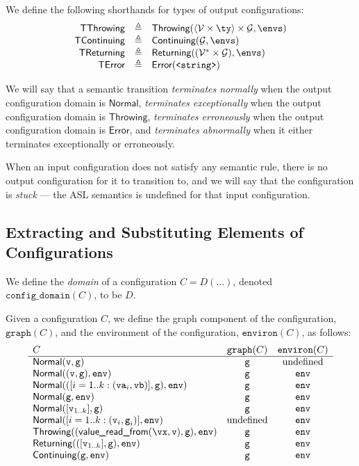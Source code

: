 \documentclass{book}
\newcommand\XGraphs[0]{\mathcal{G}}
\newcommand\vals[0]{\mathcal{V}}
\newcommand\configdomain[1]{\texttt{config\_domain}({#1})}
\newcommand\graphof[1]{\texttt{graph}({#1})}
\newcommand\environof[1]{\texttt{environ}({#1})}
\newcommand\TError[0]{\textsf{TError}}
\newcommand\TThrowing[0]{\textsf{TThrowing}}
\newcommand\TContinuing[0]{\textsf{TContinuing}}
\newcommand\TReturning[0]{\textsf{TReturning}}
\newcommand\valuereadfrom[0]{\textsf{value\_read\_from}}
\newcommand\Normal[0]{\textsf{Normal}}
\newcommand\Throwing[0]{\textsf{Throwing}}
\newcommand\Continuing[0]{\textsf{Continuing}}
\newcommand\Returning[0]{\textsf{Returning}}
\newcommand\Error[0]{\textsf{Error}}
\newcommand\env[0]{\texttt{env}}
\newcommand\vg[0]{\texttt{g}}
\newcommand\vv[0]{\texttt{v}}
\begin{document}
We define the following shorthands for types of output configurations:
\[
  \begin{array}{rcl}
    \TThrowing        &\triangleq& \Throwing(\langle\vals \times \ty\rangle \times \XGraphs, \envs)\\
    \TContinuing      &\triangleq& \Continuing(\XGraphs, \envs)\\
    \TReturning       &\triangleq& \Returning((\vals^* \times \XGraphs), \envs)\\
    \TError           &\triangleq& \Error(\texttt{<string>})\\
  \end{array}
\]

We will say that a semantic transition \emph{terminates normally} when the output configuration domain is $\Normal$,
\emph{terminates exceptionally} when the output configuration domain is $\Throwing$,
\emph{terminates erroneously} when the output configuration domain is $\Error$,
and \emph{terminates abnormally} when it either terminates exceptionally or erroneously.

When an input configuration does not satisfy any semantic rule,
there is no output configuration for it to transition to, and we will say that
the configuration is \emph{stuck} --- the ASL semantics is undefined for that
input configuration.

\subsection{Extracting and Substituting Elements of Configurations}

We define the \emph{domain} of a configuration $C=D(\ldots)$, denoted $\configdomain{C}$, to be $D$.

Given a configuration $C$, we define the graph component of the configuration, $\graphof{C}$,
and the environment of the configuration, $\environof{C}$, as follows:
\[
\begin{array}{lcc}
  C & \graphof{C} & \environof{C}\\
  \hline
  \Normal(\vv,\vg) & \vg & \text{undefined}\\
  \Normal((\vv,\vg), \env) & \vg & \env\\
  \Normal(([i=1..k: (\texttt{va}_i,\texttt{vb})],\vg), \env) & \vg & \env\\
  \Normal(\vg, \env) & \vg & \env\\
  \Normal([\vv_{1..k}], \vg) & \vg & \env\\
  \Normal([i=1..k: (\vv_i,\vg_i)], \env) & \text{undefined} & \env\\
  \Throwing((\valuereadfrom(\vx,\vv),\vg), \env) & \vg & \env\\
  \Returning(([\vv_{1..k}],\vg), \env) & \vg & \env\\
  \Continuing(\vg, \env) & \vg & \env\\
\end{array}
\]
\end{document}
